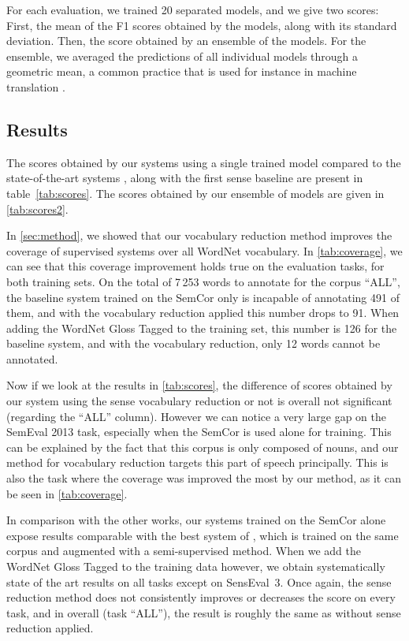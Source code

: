 \documentclass[11pt,a4paper]{article}
\begin{document}
For each evaluation, we trained 20 separated models, and we give two scores: First, the mean of the F1 scores obtained by the models, along with its standard deviation. Then, the score obtained by an ensemble of the models. For the ensemble, we averaged the predictions of all individual models through a geometric mean, a common practice that is used for instance in machine translation \citep{Sutskever2014,gehring2017}.



\subsection{Results}

The scores obtained by our systems using a single trained model compared to the state-of-the-art systems \cite{yuan_2016,raganato2017,iacobacci2016embeddings}, along with the first sense baseline are present in table~\ref{tab:scores}. The scores obtained by our ensemble of models are given in \autoref{tab:scores2}.

In \autoref{sec:method}, we showed that our vocabulary reduction method improves the coverage of supervised systems over all WordNet vocabulary. In \autoref{tab:coverage}, we can see that this coverage improvement holds true on the evaluation tasks, for both training sets. On the total of 7\,253 words to annotate for the corpus ``ALL'', the baseline system trained on the SemCor only is incapable of annotating 491 of them, and with the vocabulary reduction applied this number drops to 91. When adding the WordNet Gloss Tagged to the training set, this number is 126 for the baseline system, and with the vocabulary reduction, only 12 words cannot be annotated. 

Now if we look at the results in \autoref{tab:scores}, the difference of scores obtained by our system using the sense vocabulary reduction or not is overall not significant (regarding the ``ALL'' column). However we can notice a very large gap on the SemEval 2013 task, especially when the SemCor is used alone for training. This can be explained by the fact that this corpus is only composed of nouns, and our method for vocabulary reduction targets this part of speech principally. This is also the task where the coverage was improved the most by our method, as it can be seen in \autoref{tab:coverage}.   

In comparison with the other works, our systems trained on the SemCor alone expose results comparable with the best system of \citet{yuan_2016}, which is trained on the same corpus and augmented with a semi-supervised method. When we add the WordNet Gloss Tagged to the training data however, we obtain systematically state of the art results on all tasks except on SensEval~3. Once again, the sense reduction method does not consistently improves or decreases the score on every task, and in overall (task ``ALL''), the result is roughly the same as without sense reduction applied.
\end{document}
